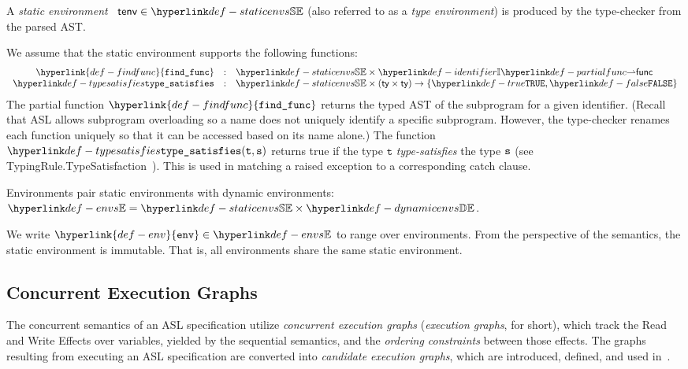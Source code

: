\documentclass{book}
\newcommand\findfunc[0]{\hyperlink{def-findfunc}{\texttt{find\_func}}}
\newcommand\env[0]{\hyperlink{def-env}{\texttt{env}}}
\newcommand\vt[0]{\texttt{t}}
\begin{document}
\hypertarget{def-staticenvs}{}
\begin{definition}
A \emph{static environment}~\cite{ASLTypingReference} $\tenv \in \staticenvs$ (also referred to as a \emph{type environment})
is produced by the type-checker from the parsed AST.

We assume that the static environment supports the following functions:
\hypertarget{def-findfunc}{}
\hypertarget{def-typesatisfies}{}
\[
  \begin{array}{rcl}
    \findfunc       &:& \staticenvs \times \Identifiers \partialto \func\\
    \typesat  &:& \staticenvs \times (\ty \times \ty) \rightarrow \{\True, \False\}
  \end{array}
\]
The partial function $\findfunc$ returns the typed AST of the subprogram for a given identifier.
(Recall that ASL allows subprogram overloading so a name does not uniquely identify
a specific subprogram.
However, the type-checker renames each function uniquely so that it can be accessed based
on its name alone.)
%
The function $\typesat(\vt, \vs)$ returns true
if the type $\vt$ \emph{type-satisfies} the type $\texttt{s}$
(see TypingRule.TypeSatisfaction~\cite{ASLTypingReference}).
This is used in matching a raised exception to a corresponding catch clause.
\end{definition}

\hypertarget{def-envs}{}
\begin{definition}[Environments]
Environments pair static environments with dynamic environments:
$\envs = \staticenvs \times \dynamicenvs$.
\end{definition}
\hypertarget{def-env}{}
We write $\env \in \envs$ to range over environments.
%
From the perspective of the semantics, the static environment is immutable.
That is, all environments share the same static environment.

\subsection{Concurrent Execution Graphs \label{sec:concurrentexecutiongraphs}}

The concurrent semantics of an ASL specification utilize \emph{concurrent execution graphs}
(\emph{execution graphs}, for short),
which track the Read and Write Effects over variables, yielded by the sequential semantics,
and the \emph{ordering constraints} between those effects.
The graphs resulting from executing an ASL specification are converted into
\emph{candidate execution graphs}, which are introduced, defined,
and used in~\cite{AlglaveMT14,alglave2016syntax,AlglaveDGHM21}.
\end{document}
